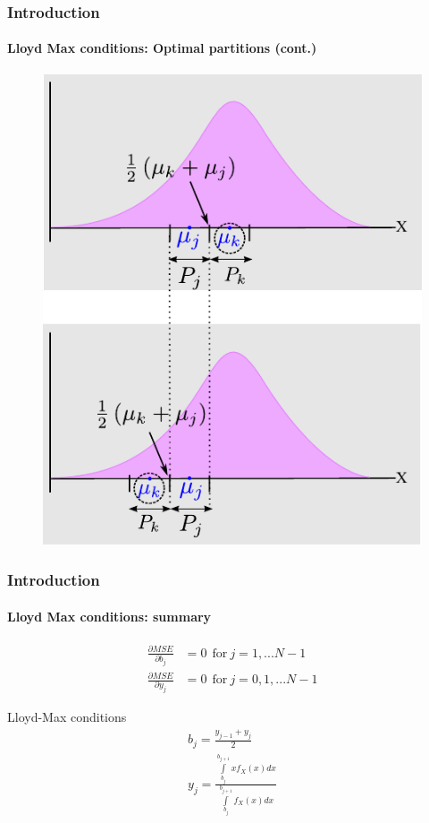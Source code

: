 \begin{frame}[plain]
\frametitle{Introduction}
\framesubtitle{Lloyd Max conditions: Optimal partitions (cont.)}
\logoCSIPCPL\mypagenum
	\begin{changemargin}{-1.3in}{0in}
		\begin{figure}				
			\includegraphics[height=0.8\textheight]{figs/Quantization_optimalPartitions2.pdf}
		\end{figure}
	\end{changemargin}
\end{frame}


\begin{frame}
\frametitle{Introduction}
\framesubtitle{Lloyd Max conditions: summary}
\logoCSIPCPL\mypagenum
	\begin{align*}				
		\frac{\partial{MSE}}{\partial b_j}&=0 \ \ 	\text{for} \ j=1, ... N-1 \\
		\frac{\partial{MSE}}{\partial y_j}&=0 \ \ 	\text{for} \ j=0,1, ... N-1 
	\end{align*}
	\begin{block}{Lloyd-Max conditions}
		\begin{align*}
			b_j = \frac{y_{j-1} + y_j}{2}\\
			y_j=\frac{\int\limits_{b_j}^{b_{j+1}} xf_X(x)dx}{\int\limits_{b_j}^{b_{j+1}} f_X(x)dx}
		\end{align*}
	\end{block}
\end{frame}




